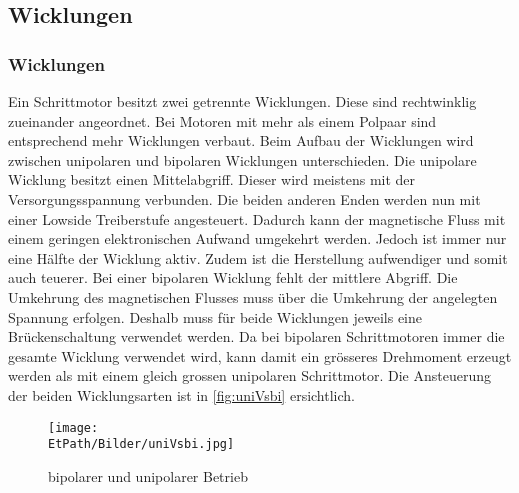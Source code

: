 \ifSTANDALONE
    \subsection{Wicklungen} \label{sec:windings}
\fi
\ifEMBED
    \subsubsection{Wicklungen} \label{sec:windings}
\fi
    Ein Schrittmotor besitzt zwei getrennte Wicklungen. Diese sind 
    rechtwinklig zueinander angeordnet. Bei Motoren mit mehr als einem Polpaar 
    sind entsprechend mehr Wicklungen verbaut. Beim Aufbau der Wicklungen 
    wird zwischen unipolaren und bipolaren Wicklungen unterschieden. 
    Die unipolare Wicklung besitzt einen Mittelabgriff. Dieser wird meistens 
    mit der Versorgungsspannung verbunden. Die beiden anderen Enden werden nun 
    mit einer Lowside Treiberstufe angesteuert. Dadurch kann der magnetische 
    Fluss mit einem geringen elektronischen Aufwand umgekehrt werden. Jedoch 
    ist immer nur eine Hälfte der Wicklung aktiv. Zudem ist die Herstellung 
    aufwendiger und somit auch teuerer. 
    Bei einer bipolaren Wicklung fehlt der mittlere Abgriff. Die Umkehrung des 
    magnetischen Flusses muss über die Umkehrung der angelegten Spannung 
    erfolgen. Deshalb muss für beide Wicklungen jeweils eine Brückenschaltung 
    verwendet werden. Da bei bipolaren Schrittmotoren immer die gesamte 
    Wicklung verwendet wird, kann damit ein grösseres Drehmoment erzeugt 
    werden als mit einem gleich grossen unipolaren Schrittmotor. 
    Die Ansteuerung der beiden Wicklungsarten ist in \autoref{fig:uniVsbi} 
    ersichtlich. \cite{Doku:Stepper}
    \begin{figure}[h!]
       	\centering
       	\texttt{[image: \\EtPath/Bilder/uniVsbi.jpg]}
       	\caption[bipolarer und unipolarer Betrieb]{bipolarer und unipolarer Betrieb \cite{Doku:Stepper}}
       	\label{fig:uniVsbi}
    \end{figure}
    
       
    
